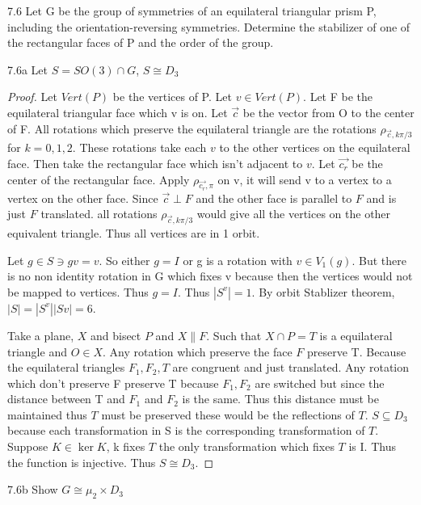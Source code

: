 \documentclass{article}
\begin{document}
\begin{PROB}{7.6}\label{Problem 7.6.}
    Let G be the group of symmetries of an equilateral triangular prism P, including the orientation-reversing symmetries. Determine the stabilizer of one of the rectangular faces of P and the order of the group.
\end{PROB}
\begin{claim}{7.6a}
    Let $S = SO(3) \cap G$, $S \cong D_3$
\end{claim}
\begin{proof}
    Let $Vert(P)$ be the vertices of P. Let $v \in Vert(P)$. Let F be the equilateral triangular face which v is on. Let $\vec{c}$ be the vector from O to the center of F. All rotations which preserve the equilateral triangle are the rotations $\rho_{\vec{c}, k\pi/3}$ for $k = 0, 1, 2$. These rotations take each $v$ to the other vertices on the equilateral face. Then take the rectangular face which isn't adjacent to $v$. Let $\vec{c_r}$ be the center of the rectangular face. Apply $\rho_{\vec{c_r}, \pi}$ on v, it will send v to a vertex to a vertex on the other face. Since $\vec{c} \perp F$ and the other face is parallel to $F$ and is just $F$ translated. all rotations $\rho_{\vec{c}, k\pi/3}$ would give all the vertices on the other equivalent triangle. Thus all vertices are in 1 orbit. 

    Let $g \in S \ni gv = v$. So either $g = I$ or g is a rotation with $v \in V_1(g)$. But there is no non identity rotation in G which fixes v because then the vertices would not be mapped to vertices. Thus $g = I$. Thus $|S^v| = 1$. By orbit Stablizer theorem, $|S| = |S^v||Sv| = 6$. 
    
    Take a plane, $X$ and bisect $P$ and $X \parallel F$. Such that $X \cap P = T$ is a equilateral triangle and $O \in X$. Any rotation which preserve the face $F$ preserve T. Because the equilateral triangles $F_1, F_2, T$ are congruent and just translated. Any rotation which don't preserve F preserve T because $F_1, F_2$ are switched but since the distance between T and $F_1$ and $F_2$ is the same. Thus this distance must be maintained thus $T$ must be preserved these would be the reflections of $T$. $S \subseteq D_3$ because each transformation in S is the corresponding transformation of $T$. Suppose $K \in \ker K$, k fixes $T$ the only transformation which fixes $T$ is I. Thus the function is injective. Thus $S \cong D_3$. 
\end{proof}
\begin{claim}{7.6b}
    Show $G \cong \mu_2 \times D_3$
\end{claim}
\end{document}
